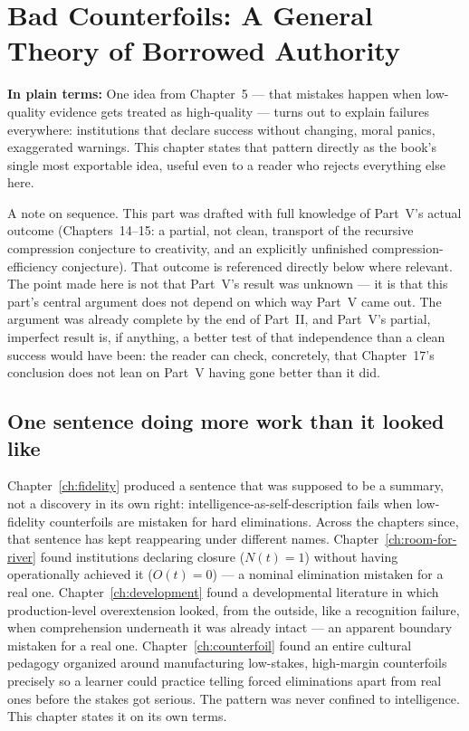 \chapter{Bad Counterfoils: A General Theory of Borrowed Authority}
\label{ch:bad-counterfoils}

\begin{plainlanguage}
\textbf{In plain terms:} One idea from Chapter~5 — that mistakes happen when low-quality evidence gets treated as high-quality — turns out to explain failures everywhere: institutions that declare success without changing, moral panics, exaggerated warnings. This chapter states that pattern directly as the book's single most exportable idea, useful even to a reader who rejects everything else here.
\end{plainlanguage}

\begin{chapternote}
A note on sequence. This part was drafted with full knowledge of Part~V's actual outcome (Chapters~14--15: a partial, not clean, transport of the recursive compression conjecture to creativity, and an explicitly unfinished compression-efficiency conjecture). That outcome is referenced directly below where relevant. The point made here is not that Part~V's result was unknown --- it is that this part's central argument does not depend on which way Part~V came out. The argument was already complete by the end of Part~II, and Part~V's partial, imperfect result is, if anything, a better test of that independence than a clean success would have been: the reader can check, concretely, that Chapter~17's conclusion does not lean on Part~V having gone better than it did.
\end{chapternote}

\section{One sentence doing more work than it looked like}

Chapter~\ref{ch:fidelity} produced a sentence that was supposed to be a summary, not a discovery in its own right: intelligence-as-self-description fails when low-fidelity counterfoils are mistaken for hard eliminations. Across the chapters since, that sentence has kept reappearing under different names. Chapter~\ref{ch:room-for-river} found institutions declaring closure ($N(t)=1$) without having operationally achieved it ($O(t)=0$) --- a nominal elimination mistaken for a real one. Chapter~\ref{ch:development} found a developmental literature in which production-level overextension looked, from the outside, like a recognition failure, when comprehension underneath it was already intact --- an apparent boundary mistaken for a real one. Chapter~\ref{ch:counterfoil} found an entire cultural pedagogy organized around manufacturing low-stakes, high-margin counterfoils precisely so a learner could practice telling forced eliminations apart from real ones before the stakes got serious. The pattern was never confined to intelligence. This chapter states it on its own terms.

